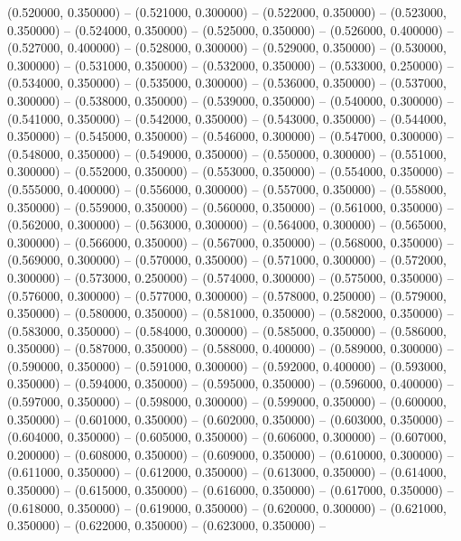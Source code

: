 (0.520000, 0.350000) -- 
(0.521000, 0.300000) -- 
(0.522000, 0.350000) -- 
(0.523000, 0.350000) -- 
(0.524000, 0.350000) -- 
(0.525000, 0.350000) -- 
(0.526000, 0.400000) -- 
(0.527000, 0.400000) -- 
(0.528000, 0.300000) -- 
(0.529000, 0.350000) -- 
(0.530000, 0.300000) -- 
(0.531000, 0.350000) -- 
(0.532000, 0.350000) -- 
(0.533000, 0.250000) -- 
(0.534000, 0.350000) -- 
(0.535000, 0.300000) -- 
(0.536000, 0.350000) -- 
(0.537000, 0.300000) -- 
(0.538000, 0.350000) -- 
(0.539000, 0.350000) -- 
(0.540000, 0.300000) -- 
(0.541000, 0.350000) -- 
(0.542000, 0.350000) -- 
(0.543000, 0.350000) -- 
(0.544000, 0.350000) -- 
(0.545000, 0.350000) -- 
(0.546000, 0.300000) -- 
(0.547000, 0.300000) -- 
(0.548000, 0.350000) -- 
(0.549000, 0.350000) -- 
(0.550000, 0.300000) -- 
(0.551000, 0.300000) -- 
(0.552000, 0.350000) -- 
(0.553000, 0.350000) -- 
(0.554000, 0.350000) -- 
(0.555000, 0.400000) -- 
(0.556000, 0.300000) -- 
(0.557000, 0.350000) -- 
(0.558000, 0.350000) -- 
(0.559000, 0.350000) -- 
(0.560000, 0.350000) -- 
(0.561000, 0.350000) -- 
(0.562000, 0.300000) -- 
(0.563000, 0.300000) -- 
(0.564000, 0.300000) -- 
(0.565000, 0.300000) -- 
(0.566000, 0.350000) -- 
(0.567000, 0.350000) -- 
(0.568000, 0.350000) -- 
(0.569000, 0.300000) -- 
(0.570000, 0.350000) -- 
(0.571000, 0.300000) -- 
(0.572000, 0.300000) -- 
(0.573000, 0.250000) -- 
(0.574000, 0.300000) -- 
(0.575000, 0.350000) -- 
(0.576000, 0.300000) -- 
(0.577000, 0.300000) -- 
(0.578000, 0.250000) -- 
(0.579000, 0.350000) -- 
(0.580000, 0.350000) -- 
(0.581000, 0.350000) -- 
(0.582000, 0.350000) -- 
(0.583000, 0.350000) -- 
(0.584000, 0.300000) -- 
(0.585000, 0.350000) -- 
(0.586000, 0.350000) -- 
(0.587000, 0.350000) -- 
(0.588000, 0.400000) -- 
(0.589000, 0.300000) -- 
(0.590000, 0.350000) -- 
(0.591000, 0.300000) -- 
(0.592000, 0.400000) -- 
(0.593000, 0.350000) -- 
(0.594000, 0.350000) -- 
(0.595000, 0.350000) -- 
(0.596000, 0.400000) -- 
(0.597000, 0.350000) -- 
(0.598000, 0.300000) -- 
(0.599000, 0.350000) -- 
(0.600000, 0.350000) -- 
(0.601000, 0.350000) -- 
(0.602000, 0.350000) -- 
(0.603000, 0.350000) -- 
(0.604000, 0.350000) -- 
(0.605000, 0.350000) -- 
(0.606000, 0.300000) -- 
(0.607000, 0.200000) -- 
(0.608000, 0.350000) -- 
(0.609000, 0.350000) -- 
(0.610000, 0.300000) -- 
(0.611000, 0.350000) -- 
(0.612000, 0.350000) -- 
(0.613000, 0.350000) -- 
(0.614000, 0.350000) -- 
(0.615000, 0.350000) -- 
(0.616000, 0.350000) -- 
(0.617000, 0.350000) -- 
(0.618000, 0.350000) -- 
(0.619000, 0.350000) -- 
(0.620000, 0.300000) -- 
(0.621000, 0.350000) -- 
(0.622000, 0.350000) -- 
(0.623000, 0.350000) -- 
